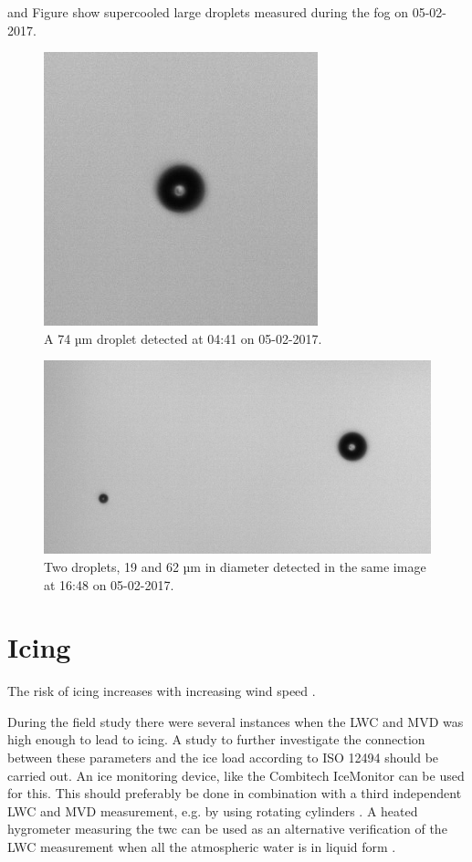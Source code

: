  and Figure  show supercooled large droplets measured during the fog on 05-02-2017.

\begin{figure}[ht]
  \centering
  \includegraphics[width=0.4\linewidth]{figures/170205_0441_droplet_74um}
\caption{A 74 µm droplet detected at 04:41 on 05-02-2017.}
\label{fig:170505_0441_droplet}
\end{figure}
\begin{figure}[ht]
  \centering
  \includegraphics[width=0.8\linewidth]{figures/170205_1648_droplet_19and62um}
\caption{Two droplets, 19 and 62 µm in diameter detected in the same image at 16:48 on 05-02-2017.}
\label{fig:170505_1648_droplet}
\end{figure}


\section{Icing}

The risk of icing increases with increasing wind speed \cite{makk2000}.

During the field study there were several instances when the LWC and MVD was high enough to lead to icing. A study to further investigate the connection between these parameters and the ice load according to ISO 12494 \cite{makk2014} should be carried out. An ice monitoring device, like the Combitech IceMonitor \cite{cost727,thors2015} can be used for this. This should preferably be done in combination with a third independent LWC and MVD measurement, e.g. by using rotating cylinders \cite{makk1992,knez2005}. A heated hygrometer measuring the \gls{twc} can be used as an alternative verification of the LWC measurement when all the atmospheric water is in liquid form \cite{spie2012}.






